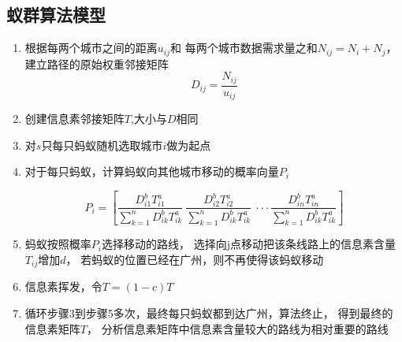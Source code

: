 \documentclass[UTF8,12pt]{ctexart}
\begin{document}
    
    \subsection{蚁群算法模型}\label{YQSFMX}
        \begin{enumerate}
            \item 根据每两个城市之间的距离$u_{ij}$和
            每两个城市数据需求量之和$N_{ij}=N_i+N_j$，建立路径的原始权重邻接矩阵
            $$D_{ij}=\frac{N_{ij}}{u_{ij}}$$
            \item 创建信息素邻接矩阵$T$,大小与$D$相同
            \item 对$s$只每只蚂蚁随机选取城市$i$做为起点
            \item 对于每只蚂蚁，计算蚂蚁向其他城市移动的概率向量$P_i$
            \begin{large}
                $$P_i=\left[\frac{D_{i1}^bT_{i1}^a}{\sum_{k=1}^n{D_{ik}^bT_{ik}^a}}~\frac{D_{i2}^bT_{i2}^a}{\sum_{k=1}^n{D_{ik}^bT_{ik}^a}}~··· \frac{D_{in}^bT_{in}^a}{\sum_{k=1}^n{D_{ik}^bT_{ik}^a}}\right]$$
            
            \end{large}
            \item 蚂蚁按照概率$P_i$选择移动的路线，
                选择向j点移动把该条线路上的信息素含量$T_{ij}$增加$d$，
                若蚂蚁的位置已经在广州，则不再使得该蚂蚁移动
            \item 信息素挥发，令$T=(1-c)T$
            \item 循环步骤3到步骤5多次，最终每只蚂蚁都到达广州，算法终止，
            得到最终的信息素矩阵$T$，
            分析信息素矩阵中信息素含量较大的路线为相对重要的路线
        \end{enumerate}
\end{document}
